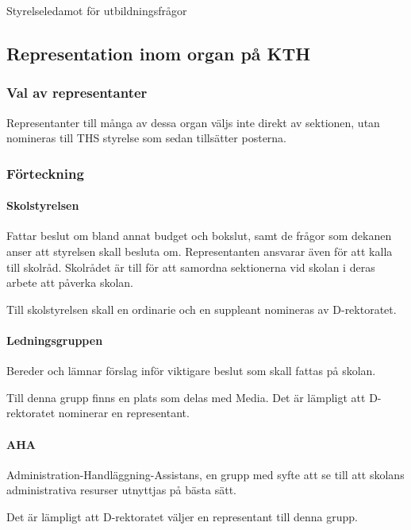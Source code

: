 \documentclass{dgovdoc}
\begin{document}
Styrelseledamot för utbildningsfrågor

\subsection{Representation inom organ på KTH}

\subsubsection{Val av representanter}

Representanter till många av dessa organ väljs inte direkt av sektionen, utan nomineras till THS styrelse som sedan tillsätter posterna.

\subsubsection{Förteckning}

\paragraph{Skolstyrelsen}

Fattar beslut om bland annat budget och bokslut, samt de frågor som dekanen anser att styrelsen skall besluta om. Representanten ansvarar även för att kalla till skolråd. Skolrådet är till för att samordna sektionerna vid skolan i deras arbete att påverka skolan.

Till skolstyrelsen skall en ordinarie och en suppleant nomineras av D-rektoratet.

\paragraph{Ledningsgruppen}

Bereder och lämnar förslag inför viktigare beslut som skall fattas på skolan.

Till denna grupp finns en plats som delas med Media. Det är lämpligt att D-rektoratet nominerar en representant.

\paragraph{AHA}

Administration-Handläggning-Assistans, en grupp med syfte att se till att skolans administrativa resurser utnyttjas på bästa sätt.

Det är lämpligt att D-rektoratet väljer en representant till denna grupp.
\end{document}
